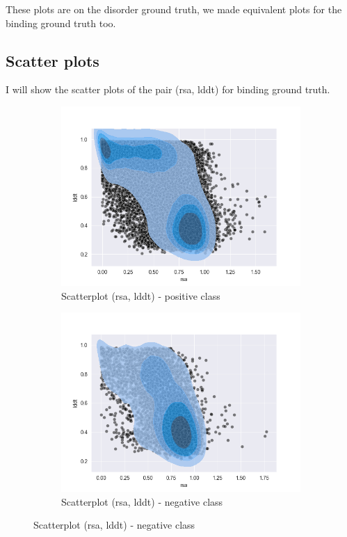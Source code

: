 These plots are on the disorder ground truth, we made equivalent plots for the binding ground truth too.

\subsection{Scatter plots}

I will show the scatter plots of the pair (rsa, lddt) for binding ground truth.

\begin{figure}[h!]
    \centering
    \begin{subfigure}{0.8\linewidth}
        \includegraphics[width=\linewidth]{res/analysis/plots/bind0-scatter_rsa-lddt.png}
        \caption{Scatterplot (rsa, lddt) - positive class}
    \end{subfigure}
    \vfill
    \begin{subfigure}{0.8\linewidth}
        \includegraphics[width=\linewidth]{res/analysis/plots/bind1-scatter_rsa-lddt.png}
        \caption{Scatterplot (rsa, lddt) - negative class}
    \end{subfigure}
\end{figure}

